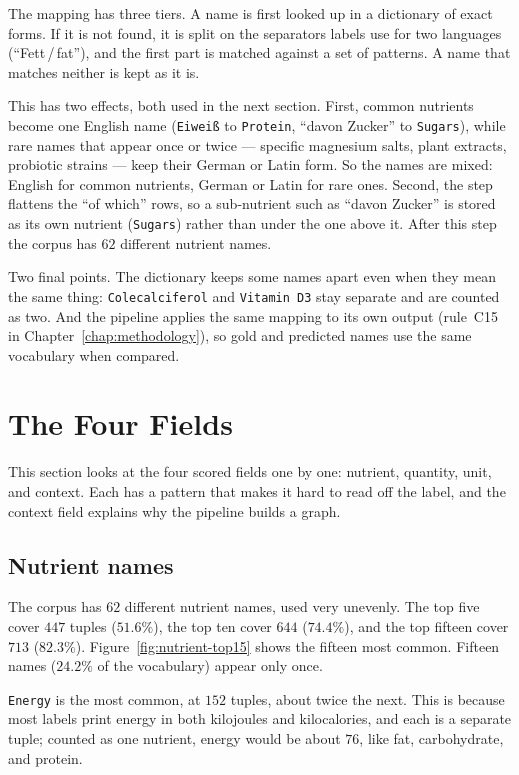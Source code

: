 The mapping has three tiers. A name is first looked up in a dictionary of
exact forms. If it is not found, it is split on the separators labels use
for two languages (``Fett\,/\,fat''), and the first part is matched against
a set of patterns. A name that matches neither is kept as it is.

This has two effects, both used in the next section. First, common
nutrients become one English name (\texttt{Eiwei{\ss}} to \texttt{Protein},
``davon Zucker'' to \texttt{Sugars}), while rare names that appear once or
twice --- specific magnesium salts, plant extracts, probiotic strains ---
keep their German or Latin form. So the names are mixed: English for common
nutrients, German or Latin for rare ones. Second, the step flattens the
``of which'' rows, so a sub-nutrient such as ``davon Zucker'' is stored as
its own nutrient (\texttt{Sugars}) rather than under the one above it. After
this step the corpus has $62$ different nutrient names.

Two final points. The dictionary keeps some names apart even when they mean
the same thing: \texttt{Colecalciferol} and \texttt{Vitamin~D3} stay
separate and are counted as two. And the pipeline applies the same mapping
to its own output (rule~C15 in Chapter~\ref{chap:methodology}), so gold and
predicted names use the same vocabulary when compared.

\FloatBarrier

\section{The Four Fields}\label{sec:fields}

This section looks at the four scored fields one by one: nutrient,
quantity, unit, and context. Each has a pattern that makes it hard to read
off the label, and the context field explains why the pipeline builds a
graph.

\subsection{Nutrient names}\label{sec:fields-nutrient}

The corpus has $62$ different nutrient names, used very unevenly. The top
five cover $447$ tuples ($51.6\%$), the top ten cover $644$ ($74.4\%$), and
the top fifteen cover $713$ ($82.3\%$). Figure~\ref{fig:nutrient-top15}
shows the fifteen most common. Fifteen names ($24.2\%$ of the vocabulary)
appear only once.

\texttt{Energy} is the most common, at $152$ tuples, about twice the next.
This is because most labels print energy in both kilojoules and
kilocalories, and each is a separate tuple; counted as one nutrient, energy
would be about $76$, like fat, carbohydrate, and protein.

